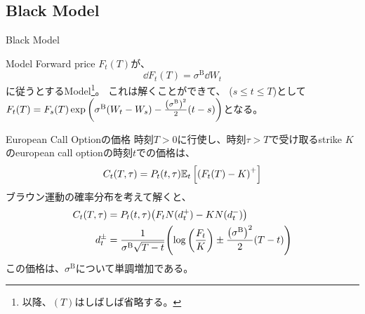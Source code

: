 \documentclass[dvipdfmx,9pt]{beamer}
\begin{document}
\subsection{Black Model}
\begin{frame}{Black Model}
  \begin{block}{Model}
    Forward price $F_{t}(T)$が、
    \begin{equation}
      \dd F_{t}(T) = \sigma^{\mathrm{B}} \dd W_{t}
    \end{equation}
    に従うとするModel\footnote{以降、$(T)$はしばしば省略する。}。
    これは解くことができて、 ($s \leq t\leq T$)として$F_{t}(T) = F_{s}(T)\expi{\sigma^{\mathrm{B}}(W_{t} - W_{s})-\frac{\pqty{\sigma^{\mathrm{B}}}^{2}}{2}(t-s)}$となる。
  \end{block}
  \begin{block}{European Call Optionの価格}
    時刻$T>0$に行使し、時刻$\tau >T$で受け取るstrike $K$のeuropean call optionの時刻$t$での価格は、
    \begin{equation}
      C_{t}(T,\tau) = P_{t}(t,\tau)\exv[t]{\pqty{F_{t}(T) - K}^{+}}
    \end{equation}
    ブラウン運動の確率分布を考えて解くと、
    \begin{align}
      C_{t}(T,\tau) & = P_{t}(t,\tau) \pqty{F_{t} N(d_{t}^{+}) - KN(d_{t}^{-})}                                                                  \\
      d_{t}^{\pm}   & = \frac{1}{\sigma^{\mathrm{B}}\sqrt{T-t}}\pqty{\log\pqty{\frac{F_{t}}{K}}\pm\frac{\pqty{\sigma^{\mathrm{B}}}^{2}}{2}(T-t)}
    \end{align}
    この価格は、$\sigma^{\mathrm{B}}$について単調増加である。
  \end{block}
\end{frame}
\end{document}
